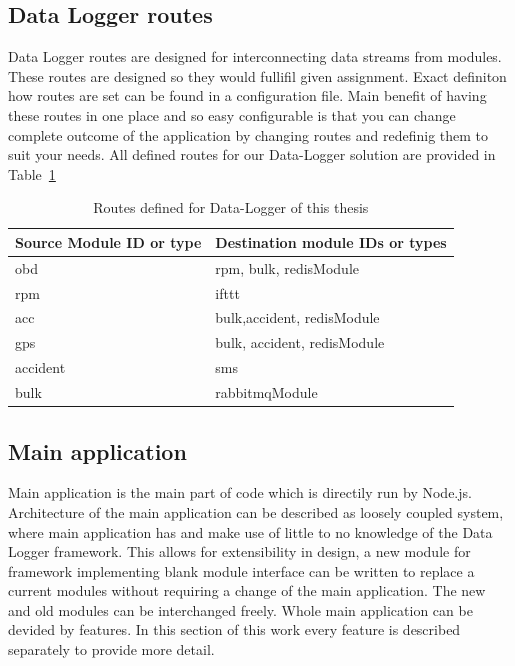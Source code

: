 \subsection{Data Logger routes} %
\label{sub:data_logger_routes}
Data Logger routes are designed for interconnecting data streams from modules. These routes are designed so they would fullifil given assignment. Exact definiton how routes are set can be found in a configuration file. Main benefit of having these routes in one place and so easy configurable is that you can change complete outcome of the application by changing routes and redefinig them to suit your needs. All defined routes for our Data-Logger solution are provided in Table~\ref{tab:tab6}
\begin{table}[H]
 \begin{center}
   \begin{tabular}{l l}
   Source Module ID or type & Destination module IDs or types\\
   \hline
   	obd & rpm, bulk, redisModule\\
    rpm & ifttt\\
    acc & bulk,accident, redisModule\\
    gps & bulk, accident, redisModule\\
    accident & sms\\
    bulk & rabbitmqModule\\
   \hline
   \end{tabular}
 \end{center}
 \caption{Routes defined for Data-Logger of this thesis}
 \label{tab:tab6}
\end{table}
\subsection{Main application} %
\label{sub:main_application}
Main application is the main part of code which is directily run by Node.js. Architecture of the main application can be described as loosely coupled system, where main application has and make use of little to no knowledge of the Data Logger framework. This allows for extensibility in design, a new module for framework implementing blank module interface can be written to replace a current modules without requiring a change of the main application. The new and old modules can be interchanged freely. Whole main application can be devided by features. In this section of this work every feature is described separately to provide more detail.
